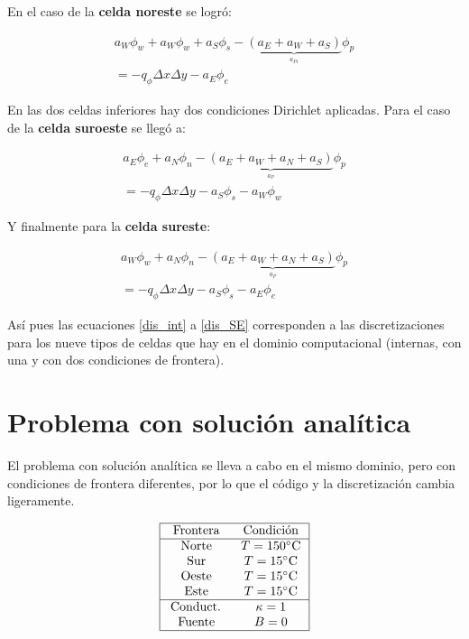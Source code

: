 \documentclass[article,latterpaper]{IEEEtran}
\begin{document}
En el caso de la \textbf{celda noreste} se logró:

\begin{multline}
    a_W\phi_w + a_W\phi_w + a_S\phi_s - \underbrace{(a_E+a_W+a_S)}_{\overset{a_{P1}}{}} \phi_p \\
    = -q_{\phi} \Delta x \Delta y - a_E\phi_e
    \label{dis_NE}
\end{multline}

En las dos celdas inferiores hay dos condiciones Dirichlet aplicadas. Para el caso de la \textbf{celda suroeste} se llegó a:

\begin{multline}
    a_E\phi_e + a_N\phi_n - \underbrace{(a_E+a_W+a_N+a_S)}_{\overset{a_{P}}{}} \phi_p \\
    = -q_{\phi} \Delta x \Delta y - a_S\phi_s - a_W\phi_w 
    \label{dis_SW}
\end{multline}

Y finalmente para la \textbf{celda sureste}:

\begin{multline}
    a_W\phi_w + a_N\phi_n - \underbrace{(a_E+a_W+a_N+a_S)}_{\overset{a_{P}}{}} \phi_p \\
    = -q_{\phi} \Delta x \Delta y - a_S\phi_s - a_E\phi_e 
    \label{dis_SE}
\end{multline}

Así pues las ecuaciones \eqref{dis_int} a \eqref{dis_SE} corresponden a las discretizaciones para los nueve tipos de celdas que hay en el dominio computacional (internas, con una y con dos condiciones de frontera).

\section{Problema con solución analítica}
El problema con solución analítica se lleva a cabo en el mismo dominio, pero con condiciones de frontera diferentes, por lo que el código y la discretización cambia ligeramente.

$$
\begin{array}{|cc|}
    \hline \text { Frontera } & \text { Condición } \\
    \hline \text { Norte } & T=150^{\circ} \mathrm{C} \\
    \text { Sur } & T=15^{\circ} \mathrm{C} \\
    \text { Oeste } & T=15^{\circ} \mathrm{C} \\
    \text { Este } & T=15^{\circ} \mathrm{C} \\
    \hline \text { Conduct. } & \kappa=1 \\
    \text { Fuente } & B=0 \\
    \hline
\end{array}
$$
\end{document}
